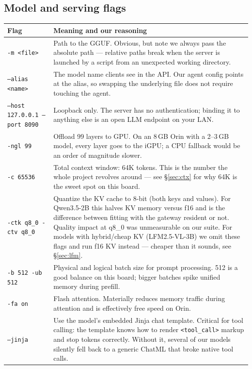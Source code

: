 \documentclass[11pt,a4paper]{article}
\newcommand{\flag}[1]{\texttt{\textcolor{flagcolour}{#1}}}
\begin{document}
\subsection{Model and serving flags}

\begin{center}
\small
\begin{tabularx}{\textwidth}{L{4.2cm} X}
\toprule
\textbf{Flag} & \textbf{Meaning and our reasoning} \\
\midrule
\flag{-m <file>} & Path to the GGUF. Obvious, but note we always pass the absolute path --- relative paths break when the server is launched by a script from an unexpected working directory. \\
\flag{--alias <name>} & The model name clients see in the API. Our agent config points at the alias, so swapping the underlying file does not require touching the agent. \\
\flag{--host 127.0.0.1 --port 8090} & Loopback only. The server has no authentication; binding it to anything else is an open LLM endpoint on your LAN. \\
\flag{-ngl 99} & Offload 99 layers to GPU. On an 8\,GB Orin with a 2--3\,GB model, every layer goes to the iGPU; a CPU fallback would be an order of magnitude slower. \\
\flag{-c 65536} & Total context window: 64K tokens. This is the number the whole project revolves around --- see \S\ref{sec:ctx} for why 64K is the sweet spot on this board. \\
\flag{-ctk q8\_0 -ctv q8\_0} & Quantize the KV cache to 8-bit (both keys and values). For Qwen3.5-2B this halves KV memory versus f16 and is the difference between fitting with the gateway resident or not. Quality impact at q8\_0 was unmeasurable on our suite. For models with hybrid/cheap KV (LFM2.5-VL-3B) we omit these flags and run f16 KV instead --- cheaper than it sounds, see \S\ref{sec:lfm}. \\
\flag{-b 512 -ub 512} & Physical and logical batch size for prompt processing. 512 is a good balance on this board; bigger batches spike unified memory during prefill. \\
\flag{-fa on} & Flash attention. Materially reduces memory traffic during attention and is effectively free speed on Orin. \\
\flag{--jinja} & Use the model's embedded Jinja chat template. Critical for tool calling: the template knows how to render \texttt{<tool\_call>} markup and stop tokens correctly. Without it, several of our models silently fell back to a generic ChatML that broke native tool calls. \\

\end{tabularx}
\end{center}
\end{document}
